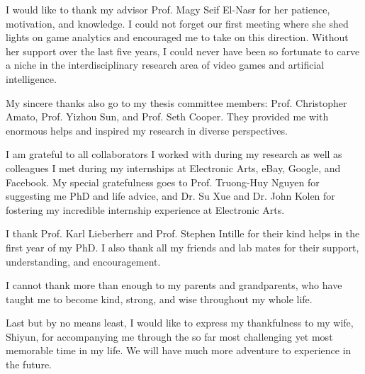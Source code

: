\documentclass[
11pt, %
english, %
doublespacing, %
headsepline, %
]{MastersDoctoralThesis} %
\begin{document}
\begin{acknowledgements}
\addchaptertocentry{\acknowledgementname} %
I would like to thank my advisor Prof. Magy Seif El-Nasr for her patience, motivation, and knowledge. I could not forget our first meeting where she shed lights on game analytics and encouraged me to take on this direction. Without her support over the last five years, I could never have been so fortunate to carve a niche in the interdisciplinary research area of video games and artificial intelligence.

My sincere thanks also go to my thesis committee members: Prof. Christopher Amato, Prof. Yizhou Sun, and Prof. Seth Cooper. They provided me with enormous helps and inspired my research in diverse perspectives. 

I am grateful to all collaborators I worked with during my research as well as colleagues I met during my internships at Electronic Arts, eBay, Google, and Facebook. My special gratefulness goes to Prof. Truong-Huy Nguyen for suggesting me PhD and life advice, and Dr. Su Xue and Dr. John Kolen for fostering my incredible internship experience at Electronic Arts.

I thank Prof. Karl Lieberherr and Prof. Stephen Intille for their kind helps in the first year of my PhD. I also thank all my friends and lab mates for their support, understanding, and encouragement.

I cannot thank more than enough to my parents and grandparents, who have taught me to become kind, strong, and wise throughout my whole life.

Last but by no means least, I would like to express my thankfulness to my wife, Shiyun, for accompanying me through the so far most challenging yet most memorable time in my life. We will have much more adventure to experience in the future.
\end{acknowledgements}


\tableofcontents %

\listoffigures %

\listoftables %

\end{document}
